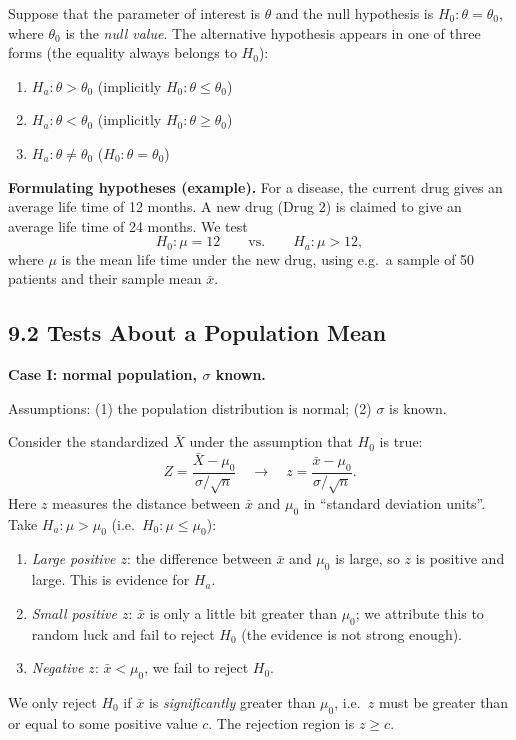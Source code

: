 Suppose that the parameter of interest is $\theta$ and the null hypothesis is
$H_0:\theta=\theta_0$, where $\theta_0$ is the \emph{null value}. The alternative
hypothesis appears in one of three forms (the equality always belongs to $H_0$):
\begin{enumerate}
  \item $H_a:\theta > \theta_0$ \quad (implicitly $H_0:\theta \le \theta_0$)
  \item $H_a:\theta < \theta_0$ \quad (implicitly $H_0:\theta \ge \theta_0$)
  \item $H_a:\theta \neq \theta_0$ \quad ($H_0:\theta = \theta_0$)
\end{enumerate}

\textbf{Formulating hypotheses (example).} For a disease, the current drug gives an
average life time of 12 months. A new drug (Drug 2) is claimed to give an average
life time of 24 months. We test
\[
H_0:\mu = 12 \qquad\text{vs.}\qquad H_a:\mu > 12,
\]
where $\mu$ is the mean life time under the new drug, using e.g.\ a sample of 50 patients and their sample mean $\bar{x}$.

\subsection*{9.2 Tests About a Population Mean}

\textbf{Case I: normal population, $\sigma$ known.}

Assumptions: (1) the population distribution is normal; (2) $\sigma$ is known.

Consider the standardized $\bar{X}$ under the assumption that $H_0$ is true:
\[
Z = \frac{\bar{X}-\mu_0}{\sigma/\sqrt{n}} \quad\longrightarrow\quad z = \frac{\bar{x}-\mu_0}{\sigma/\sqrt{n}}.
\]
Here $z$ measures the distance between $\bar{x}$ and $\mu_0$ in ``standard deviation units''.
Take $H_a:\mu>\mu_0$ (i.e.\ $H_0:\mu\le\mu_0$):
\begin{enumerate}
  \item \emph{Large positive $z$}: the difference between $\bar{x}$ and $\mu_0$ is large, so $z$ is positive and large. This is evidence for $H_a$.
  \item \emph{Small positive $z$}: $\bar{x}$ is only a little bit greater than $\mu_0$; we attribute this to random luck and fail to reject $H_0$ (the evidence is not strong enough).
  \item \emph{Negative $z$}: $\bar{x}<\mu_0$, we fail to reject $H_0$.
\end{enumerate}
We only reject $H_0$ if $\bar{x}$ is \emph{significantly} greater than $\mu_0$, i.e.\ $z$ must be
greater than or equal to some positive value $c$. The rejection region is $z \ge c$.

